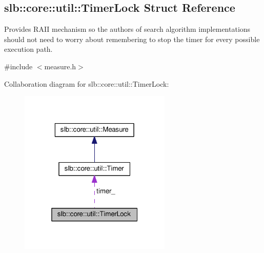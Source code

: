 \hypertarget{structslb_1_1core_1_1util_1_1TimerLock}{}\subsection{slb\+:\+:core\+:\+:util\+:\+:Timer\+Lock Struct Reference}
\label{structslb_1_1core_1_1util_1_1TimerLock}


Provides R\+A\+II mechanism so the authors of search algorithm implementations should not need to worry about remembering to stop the timer for every possible execution path.  




{\ttfamily \#include $<$measure.\+h$>$}



Collaboration diagram for slb\+:\+:core\+:\+:util\+:\+:Timer\+Lock\+:\nopagebreak
\begin{figure}[H]
\begin{center}
\leavevmode
\includegraphics[width=205pt]{structslb_1_1core_1_1util_1_1TimerLock__coll__graph}
\end{center}
\end{figure}
